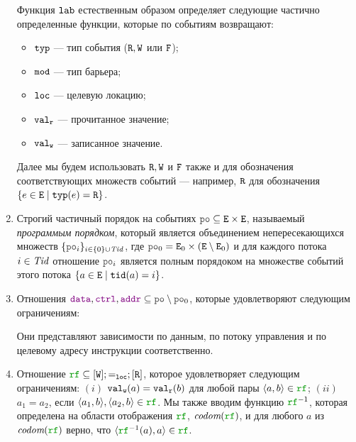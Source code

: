 \begin{definition}
\begin{enumerate}
Функция ${\mathtt{lab}}$ естественным образом определяет следующие частично определенные функции, которые
по событиям возвращают:
\begin{itemize}
  \item ${\mathtt{typ}}$ --- тип события (${\mathtt{R}},{\mathtt{W}}$ или ${\mathtt{F}}$);
  \item ${\mathtt{mod}}$ --- тип барьера;
  \item ${\mathtt{loc}}$ --- целевую локацию;
  \item ${\mathtt{val_r}}$ --- прочитанное значение;
  \item ${\mathtt{val_w}}$ --- записанное значение.
\end{itemize}
Далее мы будем использовать ${\mathtt{R}}, {\mathtt{W}}$ и ${\mathtt{F}}$ также и для обозначения соответствующих множеств
событий --- например, ${\mathtt{R}}$ для обозначения $\{e\in {\mathtt{E}} \; | \; {\mathtt{typ}}(e)={\mathtt{R}}\}$.

\item Строгий частичный порядок на событиях $\lPO \suq \lE \times \lE$, называемый \emph{программым порядком},
      который является объединением непересекающихся множеств $\{\lPO_i\}_{i\in \{0\} \cup \Tid}$,
      где $\lPO_0=\lE_0\times (\lE\setminus \lE_0)$ и для каждого потока 
      $i\in\mathit{Tid}$ отношение $\lPO_i$ является полным порядоком на множестве событий этого потока
      $\{a\in {\mathtt{E}} \; | \; {\mathtt{tid}}(a)=i\}$.

\item Отношения $\lDATA,\lCTRL,\lADDR\suq \lPO\setminus \lPO_0$, которые удовлетворяют следующим ограничениям:
\vspace{-5pt}
Они представляют зависимости по данным, по потоку управления и по целевому адресу инструкции соответственно.

\item Отношение $\lRF \suq [\lW]; {=_\lLOC}; [\lR]$, которое удовлетворяет следующим ограничениям:
$(i)$ ${\mathtt{val_w}}(a)={\mathtt{val_r}}(b)$ для любой пары $\tup{a,b}\in \lRF$;
$(ii)$ $a_1=a_2$, если $\tup{a_1,b},\tup{a_2,b}\in \lRF$. Мы также вводим функцию $\lRF^{-1}$, которая определена на
области отображения $\lRF$, $\codom{\lRF}$, и для любого $a$ из $\codom{\lRF}$ верно, что $\tup{\lRF^{-1}(a), a} \in \lRF$.


\end{enumerate}
\end{definition}
